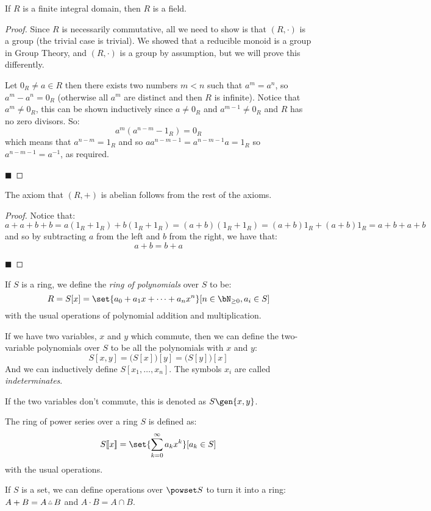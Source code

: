 \documentclass[10pt]{article}
\begin{document}
\begin{prop*}

    If $R$ is a finite integral domain, then $R$ is a field.

\end{prop*}

\begin{proof}

    Since $R$ is necessarily commutative, all we need to show is that $(R,\cdot)$ is a group (the trivial case is trivial).
    We showed that a reducible monoid is a group in Group Theory, and $(R,\cdot)$ is a group by assumption, but we will prove this differently.

    Let $0_R\neq a\in R$ then there exists two numbers $m<n$ such that $a^m=a^n$, so $a^m-a^n=0_R$ (otherwise all $a^m$ are distinct and then $R$ is infinite).
    Notice that $a^m\neq0_R$, this can be shown inductively since $a\neq0_R$ and $a^{m-1}\neq0_R$ and $R$ has no zero divisors.
    So:
    \[ a^m(a^{n-m}-1_R) = 0_R \]
    which means that $a^{n-m}=1_R$ and so $aa^{n-m-1}=a^{n-m-1}a=1_R$ so $a^{n-m-1}=a^{-1}$, as required.

    \hfill$\blacksquare$

\end{proof}

\begin{prop*}

    The axiom that $(R,+)$ is abelian follows from the rest of the axioms.

\end{prop*}

\begin{proof}

    Notice that:
    \[ a + a + b + b = a(1_R+1_R) + b(1_R+1_R) = (a+b)(1_R+1_R) = (a+b)1_R + (a+b)1_R = a + b + a + b \]
    and so by subtracting $a$ from the left and $b$ from the right, we have that:
    \[ a + b = b + a \]

    \hfill$\blacksquare$

\end{proof}

If $S$ is a ring, we define the \emph{ring of polynomials} over $S$ to be:
\[ R = S[x] = \set{a_0+a_1x+\cdots+a_nx^n}[n\in\bN_{\geq0}, a_i\in S] \]
with the usual operations of polynomial addition and multiplication.

If we have two variables, $x$ and $y$ which commute, then we can define the two-variable polynomials over $S$ to be all the polynomials with $x$ and $y$:
\[ S[x,y] = \bigl(S[x]\bigr)[y] = \bigl(S[y]\bigr)[x] \]
And we can inductively define $S[x_1,\dots,x_n]$.
The symbols $x_i$ are called \emph{indeterminates}.

If the two variables don't commute, this is denoted as $S\gen{x,y}$.

The ring of power series over a ring $S$ is defined as:
\[ S[\![x]\!] = \set{\sum_{k=0}^\infty a_kx^k}[a_k\in S] \]
with the usual operations.

If $S$ is a set, we can define operations over $\powset S$ to turn it into a ring: $A+B=A\symdif B$ and $A\cdot B=A\cap B$.
\end{document}
